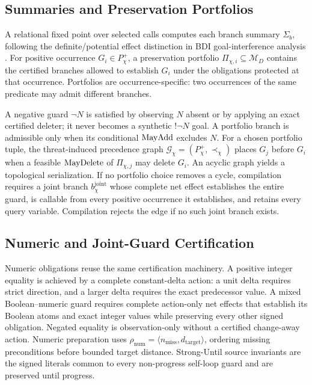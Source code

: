 \subsection{Summaries and Preservation Portfolios}

A relational fixed point over selected calls computes each branch summary
$\Sigma_b$, following the definite/potential effect distinction in BDI
goal-interference analysis \cite{Thangarajah2003GoalInterference}. For positive
occurrence $G_i\in P_\chi^+$, a preservation portfolio
$\Pi_{\chi,i}\subseteq\mathcal M_D$ contains the certified branches allowed to
establish $G_i$ under the obligations protected at that occurrence. Portfolios
are occurrence-specific: two occurrences of the same predicate may admit
different branches.

A negative guard $\neg N$ is satisfied by observing $N$ absent or by applying an
exact certified deleter; it never becomes a synthetic $!\neg N$ goal. A portfolio
branch is admissible only when its conditional $\mathrm{MayAdd}$ excludes $N$. For a
chosen portfolio tuple, the
threat-induced precedence graph
$\mathcal G_\chi=(P_\chi^+,\prec_\chi)$ places $G_j$ before $G_i$ when a feasible
$\mathrm{MayDelete}$ of $\Pi_{\chi,j}$ may delete $G_i$. An acyclic graph yields a
topological serialization. If no portfolio choice removes a cycle, compilation
requires a joint branch $b_\chi^{\mathrm{joint}}$ whose complete net effect
establishes the entire guard, is callable from every positive occurrence it
establishes, and retains every query variable. Compilation rejects the edge if
no such joint branch exists.

\subsection{Numeric and Joint-Guard Certification}

Numeric obligations reuse the same certification machinery. A positive
integer equality is achieved by a complete constant-delta action: a unit delta
requires strict direction, and a larger delta requires the exact predecessor value. A
mixed Boolean--numeric guard requires complete action-only net effects that
establish its Boolean atoms and exact integer values while preserving every
other signed obligation. Negated equality is observation-only
without a certified change-away action. Numeric preparation uses
$\rho_{\mathrm{num}}=\langle n_{\mathrm{miss}},d_{\mathrm{target}}\rangle$,
ordering missing preconditions before bounded target distance. Strong-Until
source invariants are the signed literals common to every non-progress
self-loop guard and are preserved until progress.

